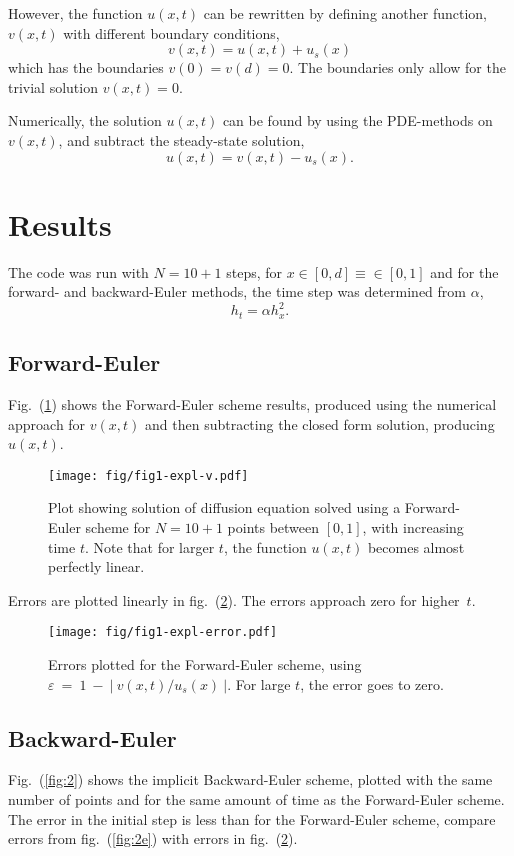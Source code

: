 \documentclass[a4paper,11pt]{article}
\begin{document}
However, the function $u(x,t)$ can be rewritten by defining another function, $v(x,t)$ with different boundary conditions,
\begin{equation}
    v(x,t) = u(x,t) + u_s(x)
    \label{eq:v}
\end{equation}
which has the boundaries $v(0) = v(d) = 0$. The boundaries only allow for the trivial solution $v(x,t) = 0$. 

Numerically, the solution $u(x,t)$ can be found by using the PDE-methods on $v(x,t)$, and subtract the steady-state solution,
\[ u(x,t) = v(x,t)- u_s(x). \]

\section{Results}
The code was run with $N=10+1$ steps, for $x\in[0,d] \equiv \in [0,1]$ and for the forward- and backward-Euler methods, the time step was determined from $\alpha$, 
\[ h_t = \alpha h_x^2. \]

\subsection{Forward-Euler}
Fig.~(\ref{fig:1}) shows the Forward-Euler scheme results, produced using the numerical approach for $v(x,t)$ and then subtracting the closed form solution, producing $u(x,t)$.

\begin{figure}[htb]
    \centering
    \texttt{[image: fig/fig1-expl-v.pdf]}
    \caption{Plot showing solution of diffusion equation solved using a Forward-Euler scheme for $N=10+1$ points between $[0,1]$, with increasing time $t$. Note that for larger $t$, the function $u(x,t)$ becomes almost perfectly linear.}
    \label{fig:1}
\end{figure}

Errors are plotted linearly in fig.~(\ref{fig:1e}). The errors approach zero for higher~$t$.

\begin{figure}[htpb]
    \centering
    \texttt{[image: fig/fig1-expl-error.pdf]}
\caption{Errors plotted for the Forward-Euler scheme, using $\varepsilon~=~1~-~|~v(x,t)/u_s(x)~| $. For large $t$, the error goes to zero. }
    \label{fig:1e}
\end{figure}

\subsection{Backward-Euler}
Fig.~(\ref{fig:2}) shows the implicit Backward-Euler scheme, plotted with the same number of points and for the same amount of time as the Forward-Euler scheme. The error in the initial step is less than for the Forward-Euler scheme, compare errors from fig.~(\ref{fig:2e}) with errors in fig.~(\ref{fig:1e}).
\end{document}
